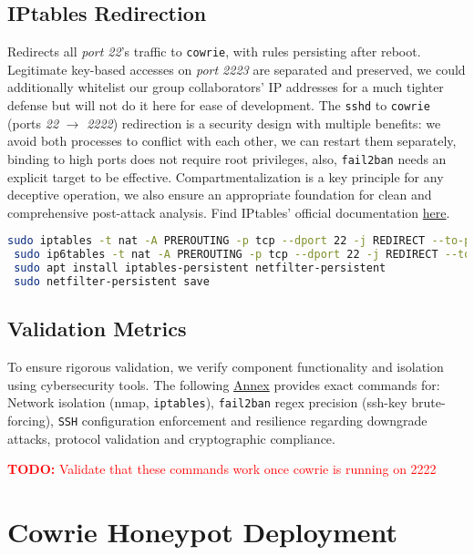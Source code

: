 \documentclass{cls/ULBreport}
\newcommand{\todo}[1]{\textcolor{red}{\textbf{TODO:} #1}}
\begin{document}
        \subsection{IPtables Redirection}
        Redirects all \textit{port 22}'s traffic to \texttt{cowrie}, with rules persisting after reboot. Legitimate key-based accesses on \textit{port 2223} are separated and preserved, we could additionally whitelist our group collaborators' IP addresses for a much tighter defense but will not do it here for ease of development. The \texttt{sshd} to \texttt{cowrie} ({ports \textit{22}} $\rightarrow$ \textit{2222}) redirection is a security design with multiple benefits: we avoid both processes to conflict with each other, we can restart them separately, binding to high ports does not require root privileges, also, \texttt{fail2ban} needs an explicit target to be effective. Compartmentalization is a key principle for any deceptive operation, we also ensure an appropriate foundation for clean and comprehensive post-attack analysis. Find IPtables' official documentation \href{https://linux.die.net/man/8/iptables}{here}. 
        \begin{lstlisting}[language=bash,caption={Traffic Redirection to Cowrie}]
 sudo iptables -t nat -A PREROUTING -p tcp --dport 22 -j REDIRECT --to-port 2222
 sudo ip6tables -t nat -A PREROUTING -p tcp --dport 22 -j REDIRECT --to-port 2222
 sudo apt install iptables-persistent netfilter-persistent
 sudo netfilter-persistent save
        \end{lstlisting}
        


        \subsection{Validation Metrics}  
        \label{sec:validation}  
        
        To ensure rigorous validation, we verify component functionality and isolation using cybersecurity tools. The following \hyperref[annexes:network]{Annex} provides exact commands for:  Network isolation (nmap, \texttt{iptables}), \texttt{fail2ban} regex precision (ssh-key brute-forcing), \texttt{SSH} configuration enforcement and resilience regarding downgrade attacks, protocol validation and cryptographic compliance.
        
    \todo{Validate that these commands work once cowrie is running on 2222}


    \section{Cowrie Honeypot Deployment}
\label{sec:cowrie}
\end{document}
